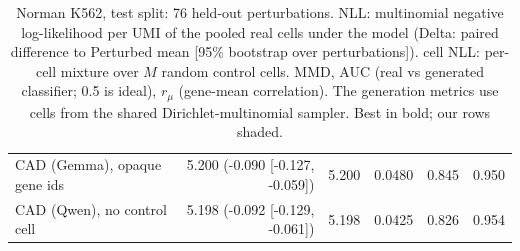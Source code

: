 \begin{table}[t]
{\begin{tabular}{lrrrrr}
\rowcolor{ours}CAD (Gemma), opaque gene ids & 5.200 (-0.090 [-0.127, -0.059]) & 5.200 & 0.0480 & 0.845 & 0.950 \\
\rowcolor{ours}CAD (Qwen), no control cell & 5.198 (-0.092 [-0.129, -0.061]) & 5.198 & 0.0425 & 0.826 & 0.954 \\
\bottomrule
\end{tabular}}
\caption{Norman K562, test split: 76 held-out perturbations. NLL: multinomial negative log-likelihood per UMI of the pooled real cells under the model (Delta: paired difference to Perturbed mean [95\% bootstrap over perturbations]). cell NLL: per-cell mixture over $M$ random control cells. MMD, AUC (real vs generated classifier; 0.5 is ideal), $r_\mu$ (gene-mean correlation). The generation metrics use cells from the shared Dirichlet-multinomial sampler. Best in bold; our rows shaded.}
\label{tab:test_norman}
\end{table}